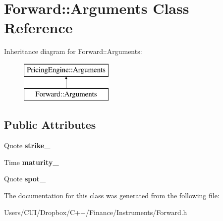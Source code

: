 \hypertarget{class_forward_1_1_arguments}{}\section{Forward\+:\+:Arguments Class Reference}
\label{class_forward_1_1_arguments}
Inheritance diagram for Forward\+:\+:Arguments\+:\begin{figure}[H]
\begin{center}
\leavevmode
\includegraphics[height=2.000000cm]{class_forward_1_1_arguments}
\end{center}
\end{figure}
\subsection*{Public Attributes}
\begin{DoxyCompactItemize}
\item 
\hypertarget{class_forward_1_1_arguments_acc295ee300d99631259b82448bc1184c}{}\label{class_forward_1_1_arguments_acc295ee300d99631259b82448bc1184c} 
Quote {\bfseries strike\+\_\+}
\item 
\hypertarget{class_forward_1_1_arguments_abfbb5b4259781ef08e2b48ff4247a484}{}\label{class_forward_1_1_arguments_abfbb5b4259781ef08e2b48ff4247a484} 
Time {\bfseries maturity\+\_\+}
\item 
\hypertarget{class_forward_1_1_arguments_a407ca35969703b95866bc0c68d49d631}{}\label{class_forward_1_1_arguments_a407ca35969703b95866bc0c68d49d631} 
Quote {\bfseries spot\+\_\+}
\end{DoxyCompactItemize}


The documentation for this class was generated from the following file\+:\begin{DoxyCompactItemize}
\item 
Users/\+C\+U\+I/\+Dropbox/\+C++/\+Finance/\+Instruments/Forward.\+h\end{DoxyCompactItemize}
